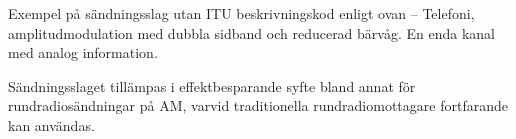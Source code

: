 Exempel på sändningsslag utan ITU beskrivningskod enligt ovan
-- Telefoni, amplitudmodulation med dubbla sidband och reducerad bärvåg.
En enda kanal med analog information.

Sändningsslaget tillämpas i effektbesparande syfte bland annat för
rundradiosändningar på AM, varvid traditionella rundradiomottagare fortfarande
kan användas.
